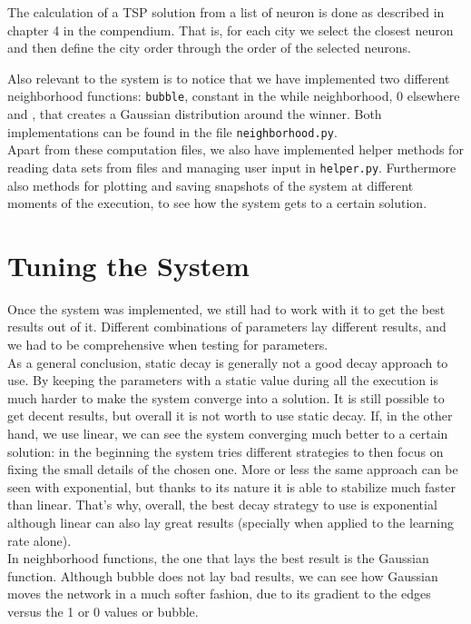 \documentclass[11pt]{article}
\begin{document}
The calculation of a TSP solution from a list of neuron is done as described in chapter 4 in the compendium. That is, for each city we select the closest neuron and then define the city order through the order of the selected neurons. 


Also relevant to the system is to notice that we have implemented two different
neighborhood functions: \texttt{bubble}, constant in the while neighborhood, 0 elsewhere and , that creates a Gaussian
distribution around the winner. Both implementations can be found in the file
\texttt{neighborhood.py}.\\

Apart from these computation files, we also have implemented helper methods for reading data sets from files and managing
user input  in \texttt{helper.py}. Furthermore also methods for plotting and saving
snapshots of the system at different moments of the execution, to see how the
system gets to a certain solution.


\section{Tuning the System}

Once the system was implemented, we still had to work with it to get the best
results out of it. Different combinations of parameters lay different results,
and we had to be comprehensive when testing for parameters.\\

As a general conclusion, static decay is generally not a good decay approach to
use. By keeping the parameters with a static value during all the execution is
much harder to make the system converge into a solution. It is still possible to
get decent results, but overall it is not worth to use static decay. If, in the
other hand, we use linear, we can see the system converging much better to a
certain solution: in the beginning the system tries different strategies to then
focus on fixing the small details of the chosen one. More or less the same
approach can be seen with exponential, but thanks to its nature it is able to
stabilize much faster than linear. That's why, overall, the best decay strategy
to use is exponential although linear can also lay great results (specially when
applied to the learning rate alone).\\

In neighborhood functions, the one that lays the best result is the Gaussian
function. Although bubble does not lay bad results, we can see how Gaussian
moves the network in a much softer fashion, due to its gradient to the edges
versus the 1 or 0 values or bubble.\\
\end{document}
